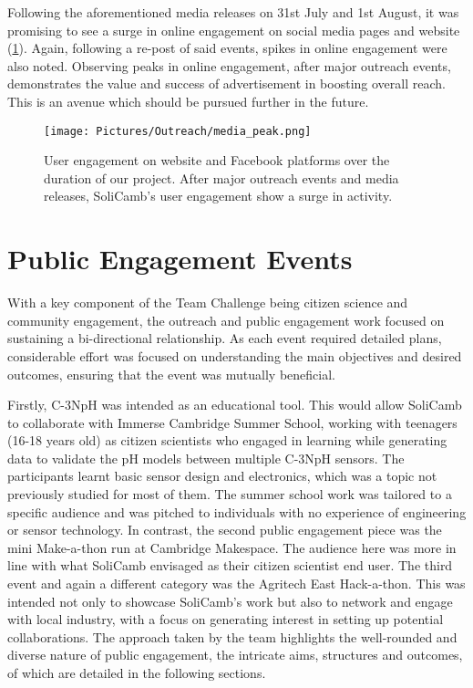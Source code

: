         Following the aforementioned media releases on 31st July and 1st August, it was promising to see a surge in online engagement on social media pages and website (\cref{fig:media_peak}). Again, following a re-post of said events, spikes in online engagement were also noted. Observing peaks in online engagement, after major outreach events, demonstrates the value and success of advertisement in boosting overall reach. This is an avenue which should be pursued further in the future. 
        
        \begin{figure}[ht]
    	\centering
    	\texttt{[image: Pictures/Outreach/media\_peak.png]}
    	\captionsetup{justification = centering}
    	\caption{ User engagement on website and Facebook platforms over the duration of our project. After major outreach events and media releases, SoliCamb's user engagement show a surge in activity.}
    	\label{fig:media_peak}
     \end{figure}
    
    
    \section{Public Engagement Events}
    With a key component of the Team Challenge being citizen science and community engagement, the outreach and public engagement work focused on sustaining a bi-directional relationship.  As each event required detailed plans, considerable effort was focused on understanding the main objectives and desired outcomes, ensuring that the event was mutually beneficial.
    
    Firstly, C-3NpH was intended as an educational tool. This would allow SoliCamb to collaborate with Immerse Cambridge Summer School, working with teenagers (16-18 years old) as citizen scientists who engaged in learning while generating data to validate the pH models between multiple C-3NpH sensors. The participants learnt basic sensor design and electronics, which was a topic not previously studied for most of them. The summer school work was tailored to a specific audience and was pitched to individuals with no experience of engineering or sensor technology. 
    In contrast, the second public engagement piece was the mini Make-a-thon run at Cambridge Makespace. The audience here was more in line with what SoliCamb envisaged as their citizen scientist end user. The third event and again a different category was the Agritech East Hack-a-thon. This was intended not only to showcase SoliCamb's work but also to network and engage with local industry, with a focus on generating interest in setting up potential collaborations. The approach taken by the team highlights the well-rounded and diverse nature of public engagement, the intricate aims, structures and outcomes, of which are detailed in the following sections.
    
